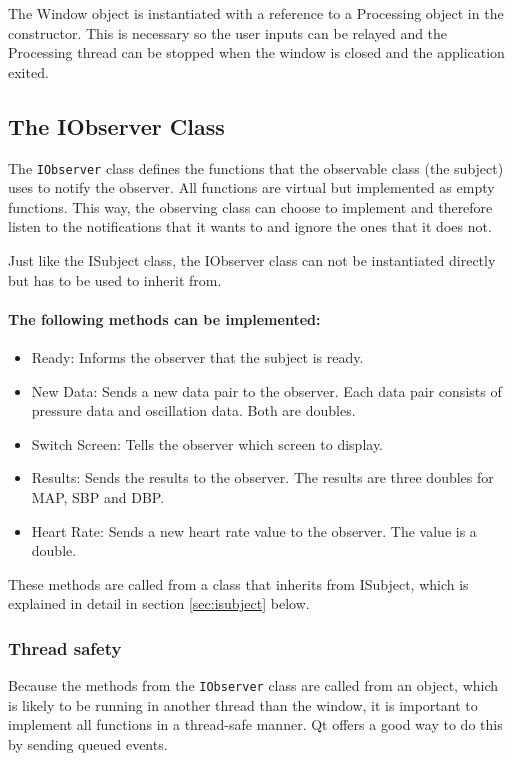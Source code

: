 The Window object is instantiated with a reference to a Processing object in the constructor. This is necessary so the user inputs can be relayed and the Processing thread can be stopped when the window is closed and the application exited. 

\subsection{The IObserver Class}
The \texttt{IObserver} class defines the functions that the observable class (the subject) uses to notify the observer. All functions are virtual but implemented as empty functions. This way, the observing class can choose to implement and therefore listen to the notifications that it wants to and ignore the ones that it does not. 

Just like the ISubject class, the IObserver class can not be instantiated directly but has to be used to inherit from. 

\paragraph{The following methods can be implemented:}
\begin{itemize}[noitemsep]
\item Ready: \newline
Informs the observer that the subject is ready.
\item New Data: \newline
Sends a new data pair to the observer. Each data pair consists of pressure data and oscillation data. Both are doubles.
\item Switch Screen: \newline
Tells the observer which screen to display.
\item Results: \newline
Sends the results to the observer. The results are three doubles for MAP, SBP and DBP.
\item Heart Rate: \newline
Sends a new heart rate value to the observer. The value is a double.
\end{itemize}

These methods are called from a class that inherits from ISubject, which is explained in detail in section \ref{sec:isubject} below. 

\subsubsection{Thread safety}
Because the methods from the \texttt{IObserver} class are called from an object, which is likely to be running in another thread than the window, it is important to implement all functions in a thread-safe manner. Qt offers a good way to do this by sending queued events. 

